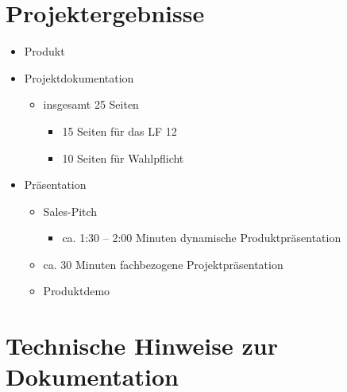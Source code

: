 \section*{Projektergebnisse}

\begin{itemize}
    \item Produkt
    \item Projektdokumentation
    \begin{itemize}
        \item insgesamt 25 Seiten
        \begin{itemize}
            \item 15 Seiten für das LF 12
            \item 10 Seiten für Wahlpflicht
        \end{itemize}
    \end{itemize}
    \item Präsentation
    \begin{itemize}
        \item Sales-Pitch
        \begin{itemize}
            \item ca. 1:30 -- 2:00 Minuten dynamische Produktpräsentation
        \end{itemize}
        \item ca. 30 Minuten fachbezogene Projektpräsentation
        \item Produktdemo
    \end{itemize}
\end{itemize}

\section*{Technische Hinweise zur Dokumentation}

